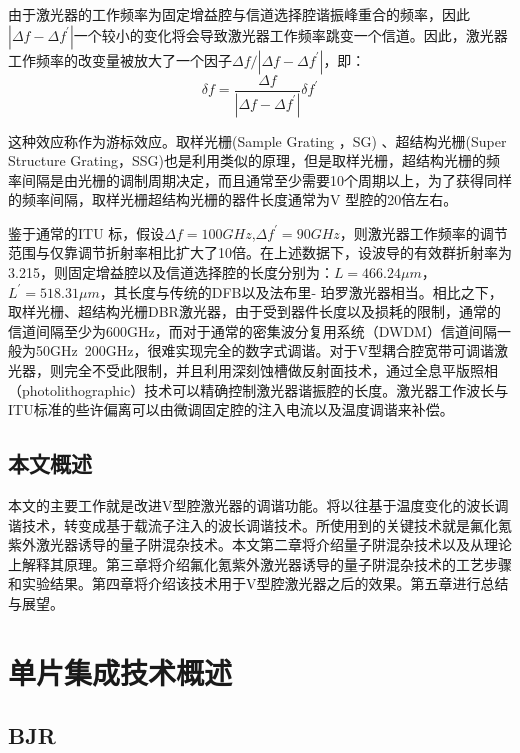 \documentclass{ZJUthesis}
\begin{document}
由于激光器的工作频率为固定增益腔与信道选择腔谐振峰重合的频率，因此$|\Delta f-\Delta f^\prime|$一个较小的变化将会导致激光器工作频率跳变一个信道。因此，激光器工作频率的改变量被放大了一个因子$\Delta f/|\Delta f-\Delta f^\prime|$，即：
\begin{equation}
  \delta f = \frac{\Delta f}{|\Delta f-\Delta f^\prime|} \delta f^\prime
\end{equation}

这种效应称作为游标效应。取样光栅(Sample Grating ，SG) 、超结构光栅(Super Structure Grating，SSG)也是利用类似的原理，但是取样光栅，超结构光栅的频率间隔是由光栅的调制周期决定，而且通常至少需要10个周期以上，为了获得同样的频率间隔，取样光栅超结构光栅的器件长度通常为V 型腔的20倍左右。

鉴于通常的ITU 标，假设$\Delta f=100GHz$,$\Delta f^\prime=90GHz$，则激光器工作频率的调节范围与仅靠调节折射率相比扩大了10倍。在上述数据下，设波导的有效群折射率为3.215，则固定增益腔以及信道选择腔的长度分别为：$L=466.24\mu m$，$L^\prime=518.31\mu m$，其长度与传统的DFB以及法布里- 珀罗激光器相当。相比之下，取样光栅、超结构光栅DBR激光器，由于受到器件长度以及损耗的限制，通常的信道间隔至少为600GHz，而对于通常的密集波分复用系统（DWDM）信道间隔一般为50GHz~200GHz，很难实现完全的数字式调谐。对于V型耦合腔宽带可调谐激光器，则完全不受此限制，并且利用深刻蚀槽做反射面技术，通过全息平版照相（photolithographic）技术可以精确控制激光器谐振腔的长度。激光器工作波长与ITU标准的些许偏离可以由微调固定腔的注入电流以及温度调谐来补偿。

\section{本文概述}

本文的主要工作就是改进V型腔激光器的调谐功能。将以往基于温度变化的波长调谐技术，转变成基于载流子注入的波长调谐技术。所使用到的关键技术就是氟化氪紫外激光器诱导的量子阱混杂技术。本文第二章将介绍量子阱混杂技术以及从理论上解释其原理。第三章将介绍氟化氪紫外激光器诱导的量子阱混杂技术的工艺步骤和实验结果。第四章将介绍该技术用于V型腔激光器之后的效果。第五章进行总结与展望。

\chapter{单片集成技术概述}

\section{BJR}
\end{document}
